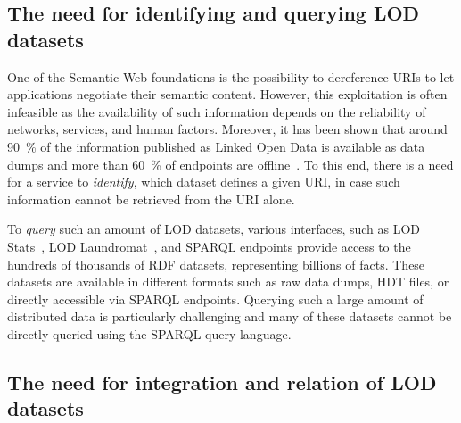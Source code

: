 \documentclass[sw]{iosart2x}
\begin{document}

\subsection{The need for identifying and querying LOD datasets}
One of the Semantic Web foundations is the possibility to dereference URIs to let applications negotiate their semantic content.
However, this exploitation is often infeasible as the availability of such information depends on the reliability of networks, services, and human factors.
Moreover, it has been shown that around \SI{90}{\percent} of the information published as Linked Open Data is available as data dumps and more than \SI{60}{\percent} of endpoints are offline~\cite{hogan2016linked}.
To this end, there is a need for a service to \emph{identify}, which dataset defines a given URI, in case such information cannot be retrieved from the URI alone.

To \emph{query} such an amount of LOD datasets, various interfaces, such as LOD Stats~\cite{auer2012lodstats}, LOD Laundromat~\cite{beek2014lod}, and SPARQL endpoints provide access to the hundreds of thousands of RDF datasets, representing billions of facts.
These datasets are available in different formats such as raw data dumps, HDT files, or directly accessible via SPARQL endpoints.
Querying such a large amount of distributed data is particularly challenging and many of these datasets cannot be directly queried using the SPARQL query language. %

\subsection{The need for integration and relation of LOD datasets}
\end{document}
